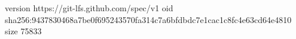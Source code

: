 version https://git-lfs.github.com/spec/v1
oid sha256:9437830468a7be0f695243570fa314c7a6bfdbdc7e1cac1c8fc4e63cd64e4810
size 75833
